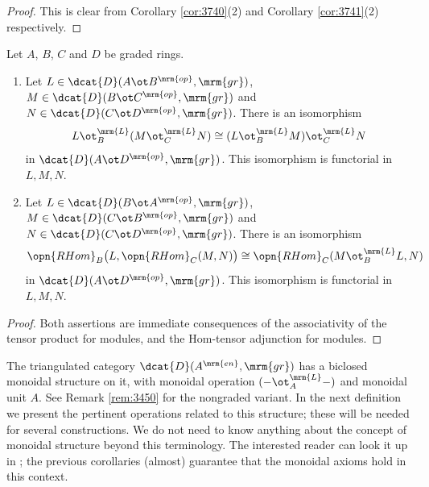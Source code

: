 \begin{proof}
This is clear from Corollary \ref{cor:3740}(2) and Corollary \ref{cor:3741}(2) 
respectively.
\end{proof}

\begin{cor} \label{cor:3742}
Let $A$, $B$, $C$ and $D$ be graded rings.
\begin{enumerate}
\item Let $L \in \dcat{D}(A \ot B^{\mrm{op}}, \mrm{gr})$, 
$M \in \dcat{D}(B \ot C^{\mrm{op}}, \mrm{gr})$ and 
$N \in \dcat{D}(C \ot D^{\mrm{op}}, \mrm{gr})$.
There is an isomorphism 
\[ L \ot^{\mrm{L}}_{B} (M \ot^{\mrm{L}}_{C} N) \cong 
(L \ot^{\mrm{L}}_{B} M) \ot^{\mrm{L}}_{C} N \]
in 
$\dcat{D}(A \ot D^{\mrm{op}}, \mrm{gr})$. 
This isomorphism is functorial in $L, M, N$.

\item Let $L \in \dcat{D}(B \ot A^{\mrm{op}}, \mrm{gr})$, 
$M \in \dcat{D}(C \ot B^{\mrm{op}}, \mrm{gr})$ and 
$N \in \dcat{D}(C \ot D^{\mrm{op}}, \mrm{gr})$.
There is an isomorphism 
\[ \opn{RHom}_{B} \bigl( L, \opn{RHom}_{C}(M, N) \bigr) \cong
\opn{RHom}_{C}(M \ot^{\mrm{L}}_{B} L, N) \]
in 
$\dcat{D}(A \ot D^{\mrm{op}}, \mrm{gr})$. 
This isomorphism is functorial in $L, M, N$.
\end{enumerate}
\end{cor}

\begin{proof}
Both assertions are immediate consequences of the associativity of the tensor 
product for modules, and the Hom-tensor adjunction for modules. 
\end{proof}

The triangulated category $\dcat{D}(A^{\mrm{en}}, \mrm{gr})$ has a biclosed 
monoidal structure on it, with monoidal operation 
$(- \ot^{\mrm{L}}_{A} -)$ and monoidal unit $A$. See Remark \ref{rem:3450} for 
the nongraded variant. In the next definition we 
present the pertinent operations related to this structure; these will be 
needed for several constructions. We do not need to know anything about 
the concept of monoidal structure beyond this terminology. 
The interested reader can look it up in \cite{Mac2}; the previous corollaries 
(almost) guarantee that the monoidal axioms hold in this context.

